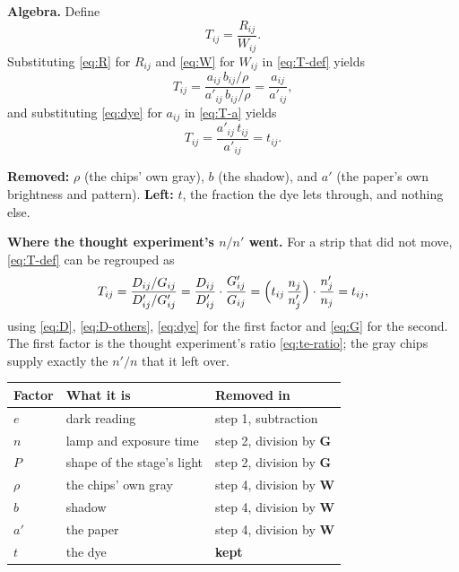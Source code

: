 \documentclass[11pt,letter]{article}
\newcommand{\iG}{\mathbf{G}}   %
\newcommand{\iW}{\mathbf{W}}   %
\begin{document}
\textbf{Algebra.}  Define
\begin{equation}
  T_{ij} = \frac{R_{ij}}{W_{ij}} .
  \label{eq:T-def}
\end{equation}
Substituting \eqref{eq:R} for $R_{ij}$ and \eqref{eq:W} for $W_{ij}$ in
\eqref{eq:T-def} yields
\begin{equation}
  T_{ij} = \frac{a_{ij}\, b_{ij} / \rho}{a'_{ij}\, b_{ij} / \rho}
         = \frac{a_{ij}}{a'_{ij}} ,
  \label{eq:T-a}
\end{equation}
and substituting \eqref{eq:dye} for $a_{ij}$ in \eqref{eq:T-a} yields
\begin{equation}
  T_{ij} = \frac{a'_{ij}\, t_{ij}}{a'_{ij}} = t_{ij} .
  \label{eq:T}
\end{equation}

\textbf{Removed:} $\rho$ (the chips' own gray), $b$ (the shadow), and $a'$
(the paper's own brightness and pattern).  \textbf{Left:} $t$, the
fraction the dye lets through, and nothing else.

\textbf{Where the thought experiment's $n/n'$ went.}  For a strip that did
not move, \eqref{eq:T-def} can be regrouped as
\begin{equation}
  T_{ij} = \frac{D_{ij}/G_{ij}}{D'_{ij}/G'_{ij}}
         = \frac{D_{ij}}{D'_{ij}} \cdot \frac{G'_{ij}}{G_{ij}}
         = \Bigl(t_{ij}\,\frac{n_j}{n'_j}\Bigr) \cdot
           \frac{n'_j}{n_j}
         = t_{ij} ,
  \label{eq:T-check}
\end{equation}
using \eqref{eq:D}, \eqref{eq:D-others}, \eqref{eq:dye} for the first
factor and \eqref{eq:G} for the second.  The first factor is the thought
experiment's ratio \eqref{eq:te-ratio}; the gray chips supply exactly the
$n'/n$ that it left over.

\medskip
\begin{center}
\begin{tabular}{@{}lll@{}}
\toprule
Factor & What it is & Removed in \\
\midrule
$e$ & dark reading & step 1, subtraction \\
$n$ & lamp and exposure time & step 2, division by $\iG$ \\
$P$ & shape of the stage's light & step 2, division by $\iG$ \\
$\rho$ & the chips' own gray & step 4, division by $\iW$ \\
$b$ & shadow & step 4, division by $\iW$ \\
$a'$ & the paper & step 4, division by $\iW$ \\
\midrule
$t$ & the dye & \textbf{kept} \\
\bottomrule
\end{tabular}
\end{center}
\end{document}
